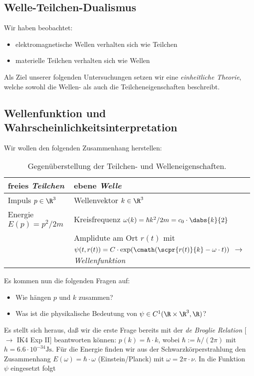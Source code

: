 \documentclass{article}
\begin{document}
    \subsection*{Welle-Teilchen-Dualismus}
        Wir haben beobachtet:
        \begin{itemize}[label=$\to$]
            \item elektromagnetische Wellen verhalten sich wie Teilchen
            \item materielle Teilchen verhalten sich wie Wellen
        \end{itemize}
        Als Ziel unserer folgenden Untersuchungen setzen wir eine \emph{einheitliche Theorie}, welche sowohl die Wellen- als auch die Teilcheneigenschaften beschreibt. 

    \subsection*{Wellenfunktion und Wahrscheinlichkeitsinterpretation}
        Wir wollen den folgenden Zusammenhang herstellen:
        \begin{table}[H]
            \centering
            \begin{tabular}{p{5cm}|p{6cm}}
                freies \emph{Teilchen} & ebene \emph{Welle} \\
                \hline
                Impuls $p\in\R^3$ & Wellenvektor $k\in\R^3$ \\
                Energie $E(p) = p^2/2m$ & Kreisfrequenz $\omega(k) = \hbar k^2/2m = c_0\cdot\dabs{k}{2}$ \\
                 & Amplidute am Ort $r(t)$ mit $\psi(t,r(t)) = C\cdot\exp(\cmath(\scpr{r(t)}{k} - \omega\cdot t))$ $\to$ \emph{Wellenfunktion}
            \end{tabular}
            \caption{Gegenüberstellung der Teilchen- und Welleneigenschaften.}
        \end{table}
        Es kommen nun die folgenden Fragen auf:
        \begin{itemize}[label=$\to$]
            \item Wie hängen $p$ und $k$ zusammen? 
            \item Was ist die physikalische Bedeutung von $\psi\in C^1(\R\times\R^3,\R)$?
        \end{itemize}
        Es stellt sich heraus, daß wir die erste Frage bereits mit der \emph{de Broglie Relation} [$\to$ IK4 Exp II] beantworten können: $p(k) = \hbar\cdot k$, wobei $\hbar:=h/(2\pi)$ mit $h = 6.6\cdot 10^{-34}\si{\joule\second}$. Für die Energie finden wir aus der Schwarzkörperstrahlung den Zusammenhang $E(\omega) = \hbar\cdot\omega$ (Einstein/Planck) mit $\omega = 2\pi\cdot\nu$. In die Funktion $\psi$ eingesetzt folgt
\end{document}
